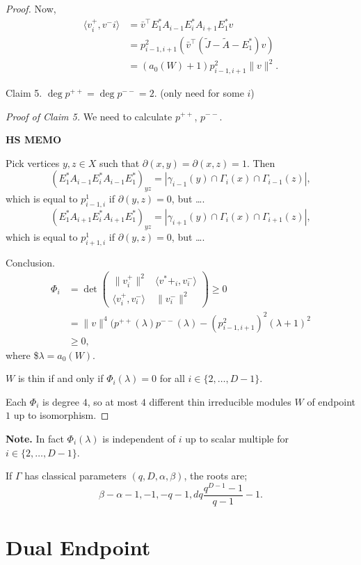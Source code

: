 \documentclass[
]{book}
\theoremstyle{definition}
\theoremstyle{definition}
\theoremstyle{definition}
\theoremstyle{definition}
\theoremstyle{remark}
\begin{document}
\begin{proof}
Now,
\begin{align}
\langle v^+_i, v^-i\rangle & = \bar{v}^\top E^*_1A_{i-1}E^*_iA_{i+1}E^*_1v\\
& = p^2_{i-1,i+1}(\bar{v}^\top (\tilde{J}-\tilde{A}-E^*_1)v)\\
& = (a_0(W)+1)p^2_{i-1,i+1}\|v\|^2.
\end{align}

Claim 5. \(\deg p^{++} = \deg p^{--} = 2\). (only need for some \(i\))

\emph{Proof of Claim 5.}
We need to calculate \(p^{++}\), \(p^{--}\).

\textbf{HS MEMO}

Pick vertices \(y,z\in X\) such that \(\partial(x,y) = \partial(x,z) =1\). Then
\[(E^*_1A_{i-1}E^*_iA_{i-1}E^*_1)_{yz} = |\gamma_{i-1}(y)\cap \Gamma_i(x)\cap \Gamma_{i-1}(z)|,\]
which is equal to \(p^{1}_{i-1,i}\) if \(\partial(y,z)=0\), but \ldots.
\[(E^*_1A_{i+1}E^*_iA_{i+1}E^*_1)_{yz} = |\gamma_{i+1}(y)\cap \Gamma_i(x)\cap \Gamma_{i+1}(z)|,\]
which is equal to \(p^{1}_{i+1,i}\) if \(\partial(y,z)=0\), but \ldots.

Conclusion.
\begin{align}
\Phi_i & = \det \begin{pmatrix}\|v^+_i\|^2 & \langle v^*+_i, v^-_i\rangle\\
\langle v^+_i,v^-_i\rangle & \|v^-_i\|^2 \end{pmatrix} \geq 0\\
& = \|v\|^4(p^{++}(\lambda)p^{--}(\lambda) - (p^2_{i-1,i+1})^2(\lambda+1)^2\\
& \geq 0,
\end{align}
where \$\(\lambda = a_0(W)\).

\(W\) is thin if and only if \(\Phi_i(\lambda) = 0\) for all \(i\in \{2, \ldots, D-1\}\).

Each \(\Phi_i\) is degree \(4\), so at most \(4\) different thin irreducible modules \(W\) of endpoint \(1\) up to isomorphism.

\end{proof}

\textbf{Note.}
In fact \(\Phi_i(\lambda)\) is independent of \(i\) up to scalar multiple for \(i\in \{2,\ldots, D-1\}\).

If \(\Gamma\) has classical parameters \((q,D, \alpha, \beta)\), the roots are;
\[\beta-\alpha-1, -1, -q-1, dq\frac{q^{D-1}-1}{q-1}-1.\]

\hypertarget{lec36}{%
\chapter{Dual Endpoint}\label{lec36}}
\end{document}
